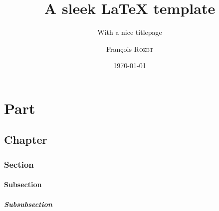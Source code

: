 \documentclass[a4paper, 12pt]{report}
\institute{Random University}
\title{A sleek \LaTeX{} template}
\subtitle{With a nice titlepage}
\author{François \textsc{Rozet}}
\date{\today}
\begin{document}
	\maketitle
	\romantableofcontents

	\part{Part}
	\chapter{Chapter}
	\section{Section}
	\subsection{Subsection}
	\subsubsection{Subsubsection}

	\nocite{einstein}
    \nocite{knuthwebsite}
	\printbibliography
\end{document}
